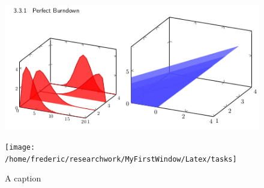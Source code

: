 \documentclass[twocolumn,landscape,8pt]{article}
\begin{document}

\begin{figure}[t]
{\footnotesize

}
\end{figure}

%

%

\begin{figure}[t]
  \centering\includegraphics[width=\columnwidth,height=0.1\textheight]{burndown}
%
\end{figure}


%


\begin{figure}[t]
  \centering\texttt{[image: /home/frederic/researchwork/MyFirstWindow/Latex/tasks]}
  \caption{A caption}
\end{figure}
\end{document}
